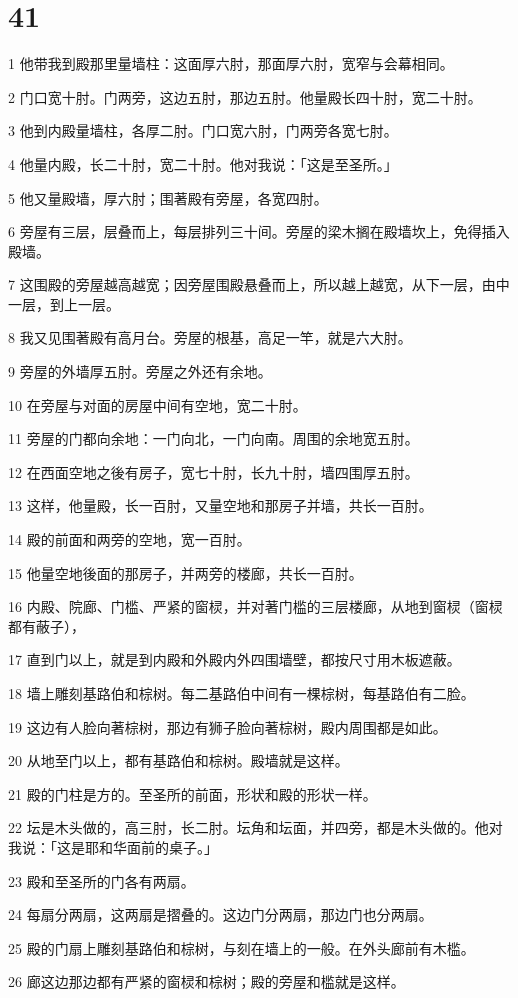\chapter{41}

\par 1 他带我到殿那里量墙柱：这面厚六肘，那面厚六肘，宽窄与会幕相同。
\par 2 门口宽十肘。门两旁，这边五肘，那边五肘。他量殿长四十肘，宽二十肘。
\par 3 他到内殿量墙柱，各厚二肘。门口宽六肘，门两旁各宽七肘。
\par 4 他量内殿，长二十肘，宽二十肘。他对我说：「这是至圣所。」
\par 5 他又量殿墙，厚六肘；围著殿有旁屋，各宽四肘。
\par 6 旁屋有三层，层叠而上，每层排列三十间。旁屋的梁木搁在殿墙坎上，免得插入殿墙。
\par 7 这围殿的旁屋越高越宽；因旁屋围殿悬叠而上，所以越上越宽，从下一层，由中一层，到上一层。
\par 8 我又见围著殿有高月台。旁屋的根基，高足一竿，就是六大肘。
\par 9 旁屋的外墙厚五肘。旁屋之外还有余地。
\par 10 在旁屋与对面的房屋中间有空地，宽二十肘。
\par 11 旁屋的门都向余地：一门向北，一门向南。周围的余地宽五肘。
\par 12 在西面空地之後有房子，宽七十肘，长九十肘，墙四围厚五肘。
\par 13 这样，他量殿，长一百肘，又量空地和那房子并墙，共长一百肘。
\par 14 殿的前面和两旁的空地，宽一百肘。
\par 15 他量空地後面的那房子，并两旁的楼廊，共长一百肘。
\par 16 内殿、院廊、门槛、严紧的窗棂，并对著门槛的三层楼廊，从地到窗棂（窗棂都有蔽子），
\par 17 直到门以上，就是到内殿和外殿内外四围墙壁，都按尺寸用木板遮蔽。
\par 18 墙上雕刻基路伯和棕树。每二基路伯中间有一棵棕树，每基路伯有二脸。
\par 19 这边有人脸向著棕树，那边有狮子脸向著棕树，殿内周围都是如此。
\par 20 从地至门以上，都有基路伯和棕树。殿墙就是这样。
\par 21 殿的门柱是方的。至圣所的前面，形状和殿的形状一样。
\par 22 坛是木头做的，高三肘，长二肘。坛角和坛面，并四旁，都是木头做的。他对我说：「这是耶和华面前的桌子。」
\par 23 殿和至圣所的门各有两扇。
\par 24 每扇分两扇，这两扇是摺叠的。这边门分两扇，那边门也分两扇。
\par 25 殿的门扇上雕刻基路伯和棕树，与刻在墙上的一般。在外头廊前有木槛。
\par 26 廊这边那边都有严紧的窗棂和棕树；殿的旁屋和槛就是这样。

